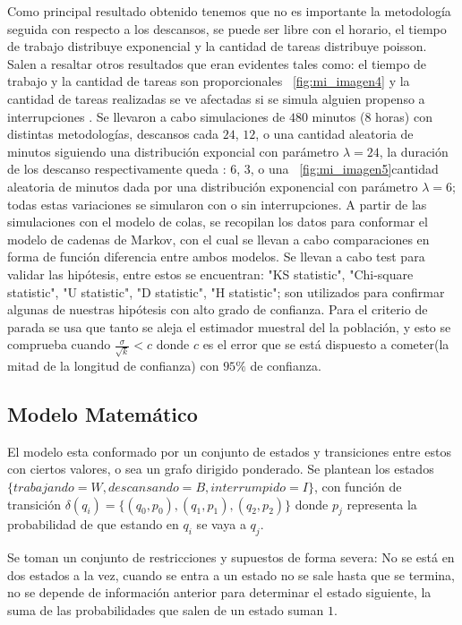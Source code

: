 \documentclass[10pt,a4paper,twocolumn]{article}
\begin{document}
Como principal resultado obtenido tenemos que no es importante la metodología seguida con respecto a los descansos, se puede ser libre con el horario, el tiempo de trabajo distribuye exponencial y la cantidad de tareas distribuye poisson. Salen a resaltar otros resultados que eran evidentes tales como: el tiempo de trabajo y la cantidad de tareas son proporcionales ~\ref{fig:mi_imagen4} y la cantidad de tareas realizadas se ve afectadas si se simula alguien propenso a interrupciones . Se llevaron a cabo simulaciones de $480$ minutos ($8$ horas) con distintas metodologías, descansos cada $24$, $12$, o una cantidad aleatoria de minutos siguiendo una distribuci\'on exponcial con par\'ametro $\lambda = 24$, la duración de los descanso respectivamente queda : $6$, $3$, o una ~\ref{fig:mi_imagen5}cantidad aleatoria de minutos dada por una distribuci\'on exponencial con par\'ametro $\lambda = 6$; todas estas variaciones se simularon con o sin interrupciones. A partir de las simulaciones con el modelo de colas, se recopilan los datos para conformar el modelo de cadenas de Markov, con el cual se llevan a cabo comparaciones en forma de funci\'on diferencia entre ambos modelos. Se llevan a cabo test para validar las hip\'otesis, entre estos se encuentran: "KS statistic", "Chi-square statistic", "U statistic", "D statistic", "H statistic"; son utilizados para confirmar algunas de nuestras hip\'otesis con alto grado de confianza. Para el criterio de parada se usa que tanto se aleja el estimador muestral del la poblaci\'on, y esto se comprueba cuando $\frac{\sigma}{\sqrt{k}} < c$ donde $c$ es el error que se est\'a dispuesto a cometer(la mitad de la longitud de confianza) con $95\%$ de confianza. 

\subsection{Modelo Matem\'atico}

El modelo esta conformado por un conjunto de estados y transiciones entre estos con ciertos valores, o sea un grafo dirigido ponderado. Se plantean los estados $\{trabajando = W, descansando = B, interrumpido = I\}$, con funci\'on de transici\'on $\delta(q_i) = \{(q_0, p_0), (q_1, p_1), (q_2, p_2)\}$ donde $p_j$ representa la probabilidad de que estando en $q_i$ se vaya a $q_j$.

Se toman un conjunto de restricciones y supuestos de forma severa: No se est\'a en dos estados a la vez, cuando se entra a un estado no se sale hasta que se termina, no se depende de informaci\'on anterior para determinar el estado siguiente, la suma de las probabilidades que salen de un estado suman $1$.
\end{document}
